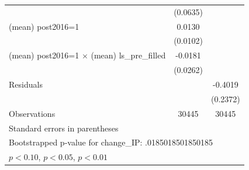 {\begin{tabular}{l*{2}{c}}
                    &    (0.0635)         &                     \\
(mean) post2016=1   &      0.0130         &                     \\
                    &    (0.0102)         &                     \\
(mean) post2016=1 $\times$ (mean) ls\_pre\_filled&     -0.0181         &                     \\
                    &    (0.0262)         &                     \\
Residuals           &                     &     -0.4019\sym{*}  \\
                    &                     &    (0.2372)         \\
\midrule
Observations        &       30445         &       30445         \\
\bottomrule
\multicolumn{3}{l}{\footnotesize Standard errors in parentheses}\\
\multicolumn{3}{l}{\footnotesize Bootstrapped p‑value for change\_IP: .0185018501850185}\\
\multicolumn{3}{l}{\footnotesize \sym{*} \(p<0.10\), \sym{**} \(p<0.05\), \sym{***} \(p<0.01\)}\\
\end{tabular}
}
